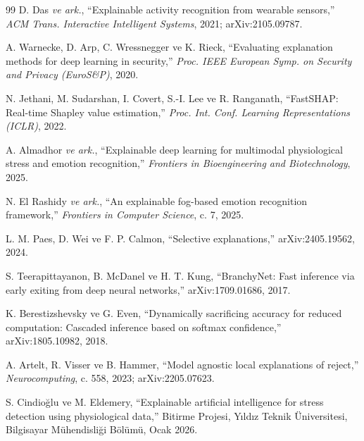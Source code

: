 \documentclass[conference]{IEEEtran}
\begin{document}
\begin{thebibliography}{99}
D. Das \emph{ve ark.}, ``Explainable activity recognition from wearable
sensors,'' \emph{ACM Trans. Interactive Intelligent Systems}, 2021;
arXiv:2105.09787.

A. Warnecke, D. Arp, C. Wressnegger ve K. Rieck, ``Evaluating explanation
methods for deep learning in security,'' \emph{Proc. IEEE European Symp. on
Security and Privacy (EuroS\&P)}, 2020.

N. Jethani, M. Sudarshan, I. Covert, S.-I. Lee ve R. Ranganath, ``FastSHAP:
Real-time Shapley value estimation,'' \emph{Proc. Int. Conf. Learning
Representations (ICLR)}, 2022.

A. Almadhor \emph{ve ark.}, ``Explainable deep learning for multimodal
physiological stress and emotion recognition,'' \emph{Frontiers in
Bioengineering and Biotechnology}, 2025.

N. El Rashidy \emph{ve ark.}, ``An explainable fog-based emotion recognition
framework,'' \emph{Frontiers in Computer Science}, c. 7, 2025.

L. M. Paes, D. Wei ve F. P. Calmon, ``Selective explanations,''
arXiv:2405.19562, 2024.

S. Teerapittayanon, B. McDanel ve H. T. Kung, ``BranchyNet: Fast inference via
early exiting from deep neural networks,'' arXiv:1709.01686, 2017.

K. Berestizshevsky ve G. Even, ``Dynamically sacrificing accuracy for reduced
computation: Cascaded inference based on softmax confidence,''
arXiv:1805.10982, 2018.

A. Artelt, R. Visser ve B. Hammer, ``Model agnostic local explanations of reject,''
\emph{Neurocomputing}, c. 558, 2023; arXiv:2205.07623.

S. Cindioğlu ve M. Eldemery, ``Explainable artificial intelligence for stress
detection using physiological data,'' Bitirme Projesi, Yıldız Teknik
Üniversitesi, Bilgisayar Mühendisliği Bölümü, Ocak 2026.

\end{thebibliography}
\end{document}
